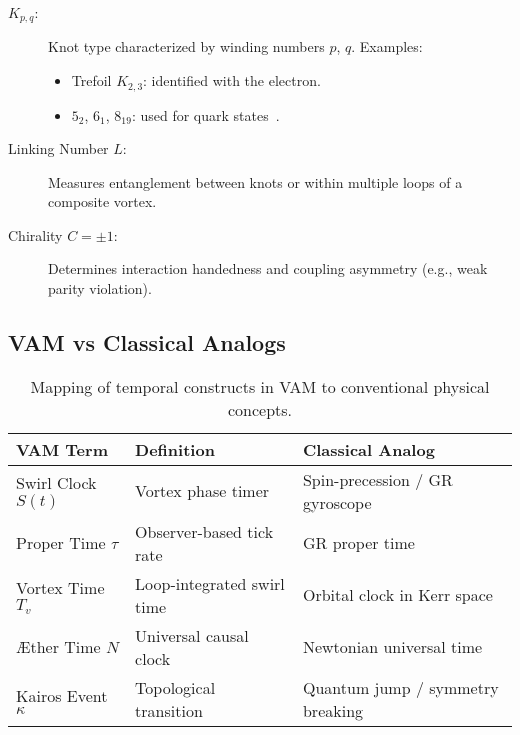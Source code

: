 \documentclass[preprint]{revtex4-2}
\begin{document}
            \begin{description}
                \item[$K_{p,q}$:] Knot type characterized by winding numbers $p$, $q$. Examples:
                \begin{itemize}
                    \item Trefoil $K_{2,3}$: identified with the electron.
                    \item $5_2$, $6_1$, $8_{19}$: used for quark states~\cite{moffatt1969knottedness}.
                \end{itemize}
        
                \item[Linking Number $L$:] Measures entanglement between knots or within multiple loops of a composite vortex.
        
                \item[Chirality $C = \pm 1$:] Determines interaction handedness and coupling asymmetry (e.g., weak parity violation).
            \end{description}
        
            \subsection*{VAM vs Classical Analogs}
        
            \begin{table}[H]
                \centering
                \footnotesize
                \begin{tabular}{|l|l|l|}
                    \hline
                    \textbf{VAM Term} & \textbf{Definition} & \textbf{Classical Analog} \\
                    \hline
                    Swirl Clock $S(t)$ & Vortex phase timer & Spin-precession / GR gyroscope \\
                    Proper Time $\tau$ & Observer-based tick rate & GR proper time \\
                    Vortex Time $T_v$ & Loop-integrated swirl time & Orbital clock in Kerr space \\
                    Æther Time $N$ & Universal causal clock & Newtonian universal time \\
                    Kairos Event $\kappa$ & Topological transition & Quantum jump / symmetry breaking \\
                    \hline
                \end{tabular}
                \caption{Mapping of temporal constructs in VAM to conventional physical concepts.}
            \end{table}
\end{document}

